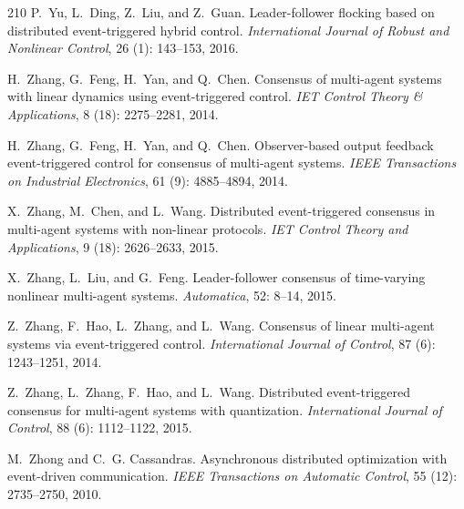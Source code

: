 \documentclass{autart}
\begin{document}
{\begin{thebibliography}{210}
P.~Yu, L.~Ding, Z.~Liu, and Z.~Guan.
\newblock Leader-follower flocking based on distributed event-triggered hybrid
  control.
\newblock \emph{International Journal of Robust and Nonlinear Control},
  26 (1): 143--153, 2016.

H.~Zhang, G.~Feng, H.~Yan, and Q.~Chen.
\newblock Consensus of multi-agent systems with linear dynamics using
  event-triggered control.
\newblock \emph{IET Control Theory \& Applications}, 8 (18):
  2275--2281, 2014{}.

H.~Zhang, G.~Feng, H.~Yan, and Q.~Chen.
\newblock Observer-based output feedback event-triggered control for consensus
  of multi-agent systems.
\newblock \emph{IEEE Transactions on Industrial Electronics}, 61
  (9): 4885--4894, 2014{}.

X.~Zhang, M.~Chen, and L.~Wang.
\newblock Distributed event-triggered consensus in multi-agent systems with
  non-linear protocols.
\newblock \emph{IET Control Theory and Applications}, 9 (18):
  2626--2633, 2015{}.

X.~Zhang, L.~Liu, and G.~Feng.
\newblock Leader-follower consensus of time-varying nonlinear multi-agent
  systems.
\newblock \emph{Automatica}, 52: 8--14, 2015{}.

Z.~Zhang, F.~Hao, L.~Zhang, and L.~Wang.
\newblock Consensus of linear multi-agent systems via event-triggered control.
\newblock \emph{International Journal of Control}, 87 (6):
  1243--1251, 2014{}.

Z.~Zhang, L.~Zhang, F.~Hao, and L.~Wang.
\newblock Distributed event-triggered consensus for multi-agent systems with
  quantization.
\newblock \emph{International Journal of Control}, 88 (6):
  1112--1122, 2015{}.

M.~Zhong and C.~G. Cassandras.
\newblock Asynchronous distributed optimization with event-driven
  communication.
\newblock \emph{IEEE Transactions on Automatic Control}, 55
  (12): 2735--2750, 2010.


\end{thebibliography}}
\end{document}
